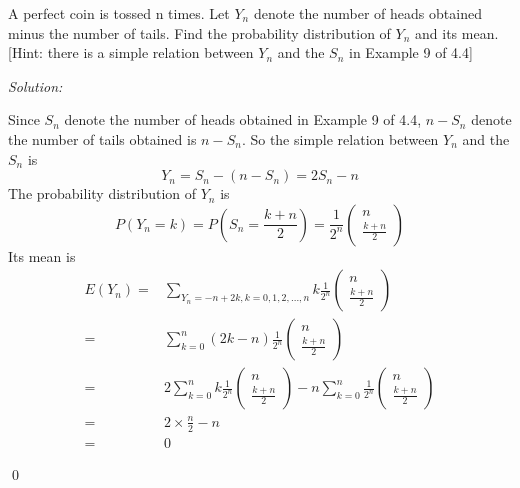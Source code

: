 \documentclass[12pt]{article}
\newenvironment{problem}[2][Problem]{\begin{trivlist}
\item[\hskip \labelsep {\bfseries #1}\hskip \labelsep {\bfseries #2.}]}{\end{trivlist}}
\newenvironment{sol}
    {\emph{Solution:}
    }
    {
    \qed
    }
\begin{document}
\begin{problem}{9}
A perfect coin is tossed n times. Let $Y_{n}$ denote the number of heads
obtained minus the number of tails. Find the probability distribution
of $Y_{n}$ and its mean.[Hint: there is a simple relation between $Y_{n}$ and the $S_{n}$ in Example 9 of 4.4]

\end{problem}
\begin{sol}
Since $S_n$ denote the number of heads obtained in Example 9 of 4.4, $n-S_n$ denote the number of tails obtained is $n-S_n$. So the simple relation between $Y_n$ and the $S_n$ is
\[
Y_n=S_n-(n-S_n)=2S_n-n
\]
The probability distribution of $Y_n$ is
\[
P(Y_n=k)=P(S_n=\frac{k+n}{2})=\frac{1}{2^n}\left(\begin{array}{c}n\\\frac{k+n}{2}\end{array}\right)
\]
Its mean is
\begin{align*}
E(Y_n)=&\sum_{Y_n=-n+2k,k=0,1,2,...,n}k\frac{1}{2^n}\left(\begin{array}{c}n\\\frac{k+n}{2}\end{array}\right)\\
=&\sum_{k=0}^n(2k-n)\frac{1}{2^n}\left(\begin{array}{c}n\\\frac{k+n}{2}\end{array}\right)\\
=&2\sum_{k=0}^nk\frac{1}{2^n}\left(\begin{array}{c}n\\\frac{k+n}{2}\end{array}\right)-n\sum_{k=0}^n\frac{1}{2^n}\left(\begin{array}{c}n\\\frac{k+n}{2}\end{array}\right)\\
=&2\times\frac{n}{2}-n\\
=&0
\end{align*}
\end{sol}
\end{document}
